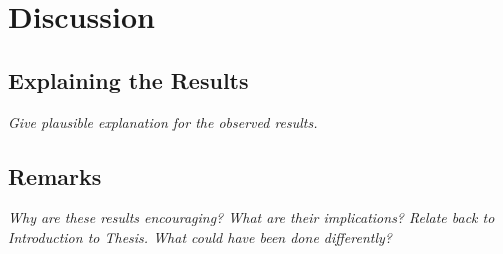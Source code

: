
\chapter{Discussion}

\section{Explaining the Results}

\textit{Give plausible explanation for the observed results.}

\section{Remarks}

\textit{Why are these results encouraging? What are their implications? Relate
back to Introduction to Thesis. What could have been done differently?}
